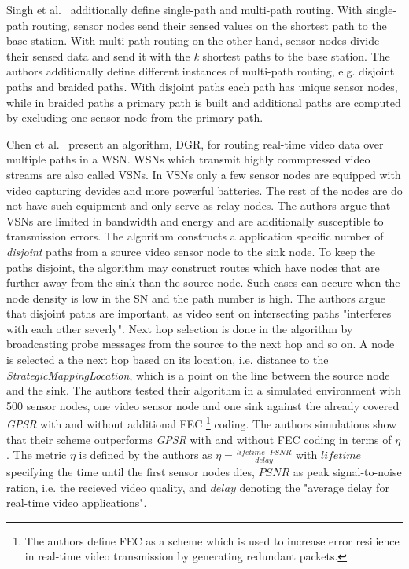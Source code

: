 Singh et al.~\cite{singh2010routing} additionally define single-path and
multi-path routing. With single-path routing, sensor nodes send their sensed
values on the shortest path to the base station. With multi-path routing on the
other hand, sensor nodes divide their sensed data and send it with the
\textit{k} shortest paths to the base station. The authors additionally define
different instances of multi-path routing, e.g. disjoint paths and braided
paths. With disjoint paths each path has unique sensor nodes, while in braided
paths a primary path is built and additional paths are computed by excluding
one sensor node from the primary path.

Chen et al.~\cite{chen2011itinerary} present an algorithm, \ac{DGR}, for
routing real-time video data over multiple paths in a \ac{WSN}. \acp{WSN} which
transmit highly commpressed video streams are also called \acp{VSN}. In
\acp{VSN} only a few sensor nodes are equipped with video capturing devides and
more powerful batteries. The rest of the nodes are do not have such equipment
and only serve as relay nodes. The authors argue that \acp{VSN} are limited in
bandwidth and energy and are additionally susceptible to transmission errors.
The algorithm constructs a application specific number of \textit{disjoint}
paths from a source video sensor node to the sink node. To keep the paths
disjoint, the algorithm may construct routes which have nodes that are further
away from the sink than the source node. Such cases can occure when the node
density is low in the \ac{SN} and the path number is high. The authors argue
that disjoint paths are important, as video sent on intersecting paths
"interferes with each other severly". Next hop selection is done in the
algorithm by broadcasting probe messages from the source to the next hop and so
on. A node is selected a the next hop based on its location, i.e. distance to
the \textit{StrategicMappingLocation}, which is a point on the line between the
source node and the sink. The authors tested their algorithm in a simulated
environment with 500 sensor nodes, one video sensor node and one sink against
the already covered \textit{GPSR} with and without additional \ac{FEC}
\footnote{The authors define \ac{FEC} as a scheme which is used to increase
error resilience in real-time video transmission by generating redundant
packets.} coding. The authors simulations show that their scheme outperforms
\textit{GPSR} with and without \ac{FEC} coding in terms of $ \eta $. The metric
$ \eta $ is defined by the authors as $ \eta = \frac{lifetime \cdot
PSNR}{delay}$ with $ lifetime $ specifying the time until the first sensor
nodes dies, $ PSNR $ as peak signal-to-noise ration, i.e. the recieved video
quality, and $ delay $ denoting the "average delay for real-time video
applications".

